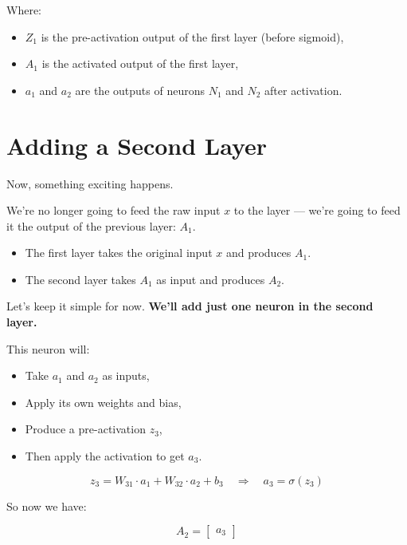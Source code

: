 \documentclass[11pt]{article}
\begin{document}
Where:
\begin{itemize}
  \item $Z_1$ is the pre-activation output of the first layer (before sigmoid),
  \item $A_1$ is the activated output of the first layer,
  \item $a_1$ and $a_2$ are the outputs of neurons $N_1$ and $N_2$ after activation.
\end{itemize}

\section{Adding a Second Layer}

Now, something exciting happens.

We’re no longer going to feed the raw input $x$ to the layer —  
we’re going to feed it the output of the previous layer: $A_1$.

\begin{defbox}[title=Deep Architecture]
\begin{itemize}
    \item The first layer takes the original input $x$ and produces $A_1$.
    \item The second layer takes $A_1$ as input and produces $A_2$.
\end{itemize}
\end{defbox}

Let’s keep it simple for now.  
\textbf{We’ll add just one neuron in the second layer.}

This neuron will:
\begin{itemize}
  \item Take $a_1$ and $a_2$ as inputs,
  \item Apply its own weights and bias,
  \item Produce a pre-activation $z_3$,
  \item Then apply the activation to get $a_3$.
\end{itemize}

\[
z_3 = W_{31} \cdot a_1 + W_{32} \cdot a_2 + b_3
\quad \Rightarrow \quad
a_3 = \sigma(z_3)
\]

So now we have:

\[
A_2 =
\begin{bmatrix}
a_3
\end{bmatrix}
\]
\end{document}
